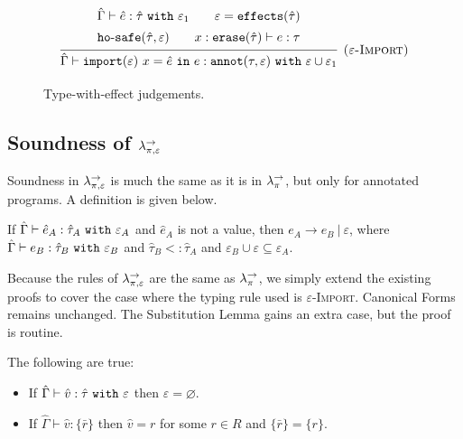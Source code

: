 \begin{figure}[h]

\noindent
{}

\[
\begin{array}{c}

\infer[\textsc{($\varepsilon$-Import)}]
	{ \hat \Gamma \vdash \kwa{import}(\varepsilon)~x = \hat e~\kw{in} e: \kwa{annot}(\tau, \varepsilon)~\kw{with} \varepsilon \cup \varepsilon_1 }
{{\def\arraystretch{1.4}
  \begin{array}{c}
\hat \Gamma \vdash \hat e: \hat \tau~\kw{with} \varepsilon_1
~~~~~~
\varepsilon = \kwa{effects}(\hat \tau) \\
\kwa{ho \hyphen safe}(\hat \tau, \varepsilon) ~~~~~~ x: \kwa{erase}(\hat \tau) \vdash e: \tau
  \end{array}}} 
 
\end{array}
\]


\vspace{-7pt}
\caption{Type-with-effect judgements.}
\label{This is the label.}
\end{figure}




\subsection{Soundness of $\lambda^{\rightarrow}_{\pi, \varepsilon}$}

Soundness in $\lambda^{\rightarrow}_{\pi, \varepsilon}$ is much the same as it is in $\lambda^{\rightarrow}_{\pi}$, but only for annotated programs. A definition is given below.

\begin{theorem}[Soundness]
If $\hat \Gamma \vdash \hat e_A: \hat \tau_A~\mathtt{with}~ \varepsilon_A$ and $\hat e_A$ is not a value, then $e_A \longrightarrow e_B~|~\varepsilon$, where $\hat \Gamma \vdash e_B: \hat \tau_B~\mathtt{with}~ \varepsilon_B$ and $\hat \tau_B <: \hat \tau_A$ and $\varepsilon_B \cup \varepsilon \subseteq \varepsilon_A$.
\end{theorem}

Because the rules of $\lambda^{\rightarrow}_{\pi, \varepsilon}$ are the same as $\lambda^{\rightarrow}_{\pi}$, we simply extend the existing proofs to cover the case where the typing rule used is \textsc{$\varepsilon$-Import}. Canonical Forms remains unchanged. The Substitution Lemma gains an extra case, but the proof is routine.

\begin{lemma}
The following are true:
\begin{itemize}
	\setlength\itemsep{-0.7em}
	\item If $\hat \Gamma \vdash \hat v: \hat \tau~\mathtt{with}~ \varepsilon$ then $\varepsilon = \varnothing$.
	\item If $\hat \Gamma \vdash \hat v: \{ \bar r \}$ then $\hat v = r$ for some $r \in R$ and $\{ \bar r \} = \{ r \}$.
\end{itemize}
\end{lemma}


